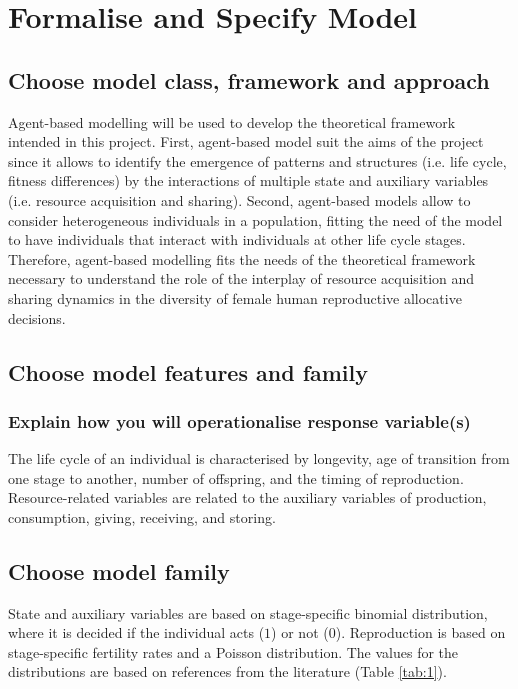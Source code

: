 \documentclass{article}
\begin{document}
\section{Formalise and Specify Model}

\subsection{Choose model class, framework and approach}

Agent-based modelling will be used to develop the theoretical framework intended in this project. First, agent-based model suit the aims of the project since it allows to identify the emergence of patterns and structures (i.e. life cycle, fitness differences) by the interactions of multiple state and auxiliary variables (i.e. resource acquisition and sharing). Second, agent-based models allow to consider heterogeneous individuals in a population, fitting the need of the model to have individuals that interact with individuals at other life cycle stages. Therefore, agent-based modelling fits the needs of the theoretical framework necessary to understand the role of the interplay of resource acquisition and sharing dynamics in the diversity of female human reproductive allocative decisions.

\subsection{Choose model features and family}

\subsubsection{Explain how you will operationalise response variable(s)}

The life cycle of an individual is characterised by longevity, age of transition from one stage to another, number of offspring, and the timing of reproduction. Resource-related variables are related to the auxiliary variables of production, consumption, giving, receiving, and storing.

\subsection{Choose model family}

State and auxiliary variables are based on stage-specific binomial distribution, where it is decided if the individual acts ($1$) or not ($0$). Reproduction is based on stage-specific fertility rates and a Poisson distribution. The values for the distributions are based on references from the literature (Table \ref{tab:1}).
\end{document}

